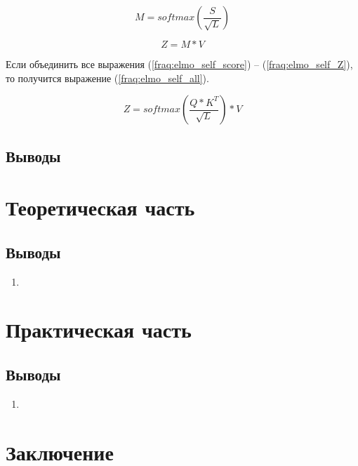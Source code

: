 \documentclass[a4paper,14pt]{article}
\begin{document}
\begin{equation}
	M = softmax(\dfrac{S}{\sqrt{L}})
	\label{fraq:elmo_self_softmax}
\end{equation}

\begin{equation}
	Z =  M * V
	\label{fraq:elmo_self_Z}
\end{equation}

Если объединить все выражения (\ref{fraq:elmo_self_score}) -- (\ref{fraq:elmo_self_Z}), то получится выражение (\ref{fraq:elmo_self_all}).

\begin{equation}
	Z =  softmax(\dfrac{Q * K^T}{\sqrt{L}}) * V
	\label{fraq:elmo_self_all}
\end{equation}

\subsection{Выводы}

\newpage

\section{Теоретическая часть}
\subsection{Выводы}
\begin{enumerate}
	\itemsep0em 
	\item 
\end{enumerate}

\newpage
\section{Практическая часть}

\subsection{Выводы}
\begin{enumerate}
	\itemsep0em 
	\item 
\end{enumerate}

\newpage
\section{Заключение}

\newpage 
\renewcommand{\refname}{{\normalsize \hfill Список использованных источников \hfill}} 

\begin{thebibliography}{30}

\end{thebibliography}

\newpage
\end{document}
